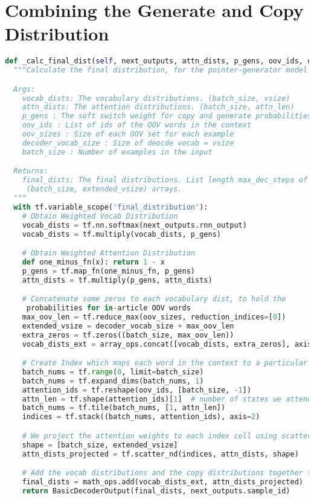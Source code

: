 \section{Combining the Generate and Copy Distribution}
\begin{lstlisting}[language=Python]
def _calc_final_dist(self, next_outputs, attn_dists, p_gens, oov_ids, oov_sizes, decoder_vocab_size, batch_size):
  """Calculate the final distribution, for the pointer-generator model

  Args:
    vocab_dists: The vocabulary distributions. (batch_size, vsize)
    attn_dists: The attention distributions. (batch_size, attn_len)
    p_gens : The soft switch weight for copy and generate probabilities
    oov_ids : List of ids of the OOV words in the context
    oov_sizes : Size of each OOV set for each example
    decoder_vocab_size : Size of deocde vocab = vsize
    batch_size : Number of examples in the input

  Returns:
    final_dists: The final distributions. List length max_dec_steps of 
     (batch_size, extended_vsize) arrays.
  """
  with tf.variable_scope('final_distribution'):
  	# Obtain Weighted Vocab Distribution
    vocab_dists = tf.nn.softmax(next_outputs.rnn_output)
    vocab_dists = tf.multiply(vocab_dists, p_gens)

    # Obtain Weighted Attention Distribution
    def one_minus_fn(x): return 1 - x
    p_gens = tf.map_fn(one_minus_fn, p_gens)
    attn_dists = tf.multiply(p_gens, attn_dists)

    # Concatenate some zeros to each vocabulary dist, to hold the 
     probabilities for in-article OOV words
    max_oov_len = tf.reduce_max(oov_sizes, reduction_indices=[0])
    extended_vsize = decoder_vocab_size + max_oov_len
    extra_zeros = tf.zeros((batch_size, max_oov_len))    
    vocab_dists_ext = array_ops.concat([vocab_dists, extra_zeros], axis=1)

    # Create Index which maps each word in the context to a particular cell
    batch_nums = tf.range(0, limit=batch_size) 
    batch_nums = tf.expand_dims(batch_nums, 1) 
    attention_ids = tf.reshape(oov_ids, [batch_size, -1])
    attn_len = tf.shape(attention_ids)[1]  # number of states we attend over
    batch_nums = tf.tile(batch_nums, [1, attn_len])
    indices = tf.stack((batch_nums, attention_ids), axis=2)

    # We project the attention weights to each index cell using scatter_nd
    shape = [batch_size, extended_vsize]
    attn_dists_projected = tf.scatter_nd(indices, attn_dists, shape)

    # Add the vocab distributions and the copy distributions together to get the final distributions
    final_dists = math_ops.add(vocab_dists_ext, attn_dists_projected)
    return BasicDecoderOutput(final_dists, next_outputs.sample_id)

\end{lstlisting}